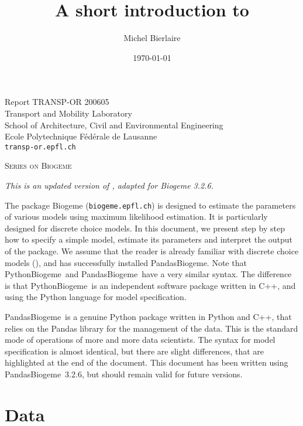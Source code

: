 \documentclass[12pt,a4paper]{article}
\title{A short introduction to \PDBIOGEME}
\author{Michel Bierlaire}
\date{\today}
\newcommand{\PBIOGEME}{PythonBiogeme}
\newcommand{\PDBIOGEME}{PandasBiogeme}
\begin{document}
\begin{titlepage}
\pagestyle{empty}

\maketitle
\vspace{2cm}

\begin{center}
\small Report TRANSP-OR 200605 \\ Transport and Mobility Laboratory \\ School of Architecture, Civil and Environmental Engineering \\ Ecole Polytechnique F\'ed\'erale de Lausanne \\ \verb+transp-or.epfl.ch+
\begin{center}
\textsc{Series on Biogeme}
\end{center}

\emph{This is an updated version of , adapted for
  Biogeme 3.2.6.}
\end{center}


\clearpage
\end{titlepage}


The package Biogeme (\texttt{biogeme.epfl.ch}) is designed to estimate the parameters of
various models using maximum likelihood estimation. It is particularly
designed for discrete choice models. In this document, we present step
by step how to specify a simple model, estimate its parameters and
interpret the output of the  package.  We assume that the
reader is already familiar with discrete choice models (\cite{BenALerm85}), and has
successfully installed \PDBIOGEME. Note that \PBIOGEME\ and \PDBIOGEME\
have a very similar syntax. The difference is that \PBIOGEME\ is an
independent software package written in C++, and using the Python
language for model specification.



\PDBIOGEME\ is a genuine Python
package written in Python and C++, that relies on the Pandas library
for the management of the data. This is the standard mode of operations of more and more
data scientists. The syntax for model specification is
almost identical, but there are slight differences, that are
highlighted at the end of the document.  This document has been written using
\PDBIOGEME\ 3.2.6, but should remain valid for future versions.  

\section{Data}
\end{document}
